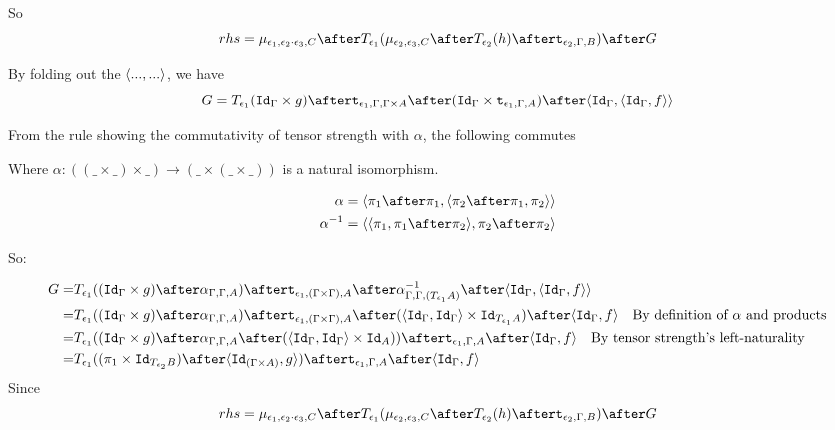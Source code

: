 \documentclass{report}
\begin{document}
So
\begin{equation}
    rhs = \bind{\e_1}{\e_2\dot\e_3}{C}\after\T{\e_1}{(\bind{\e_2}{\e_3}{C}\after \T{\e_2}{(h)} \after \tstrength{\e_2}{\G}{B})}\after G
\end{equation}


By folding out the $\langle..., ...\rangle$, we have
\begin{equation}
    G = \T{\e_1}{(\idg\times g)}\after\tstrength{\e_1}{\G}{\G \times A}\after(\idg\times\tstrength{\e_1}{\G}{A})\after\pr{\idg}{\pr{\idg}{f}}
\end{equation}

From the rule  showing the commutativity of tensor strength with $\alpha$, the following commutes


Where $\alpha: ((\_ \times \_) \times \_) \rightarrow (\_ \times (\_ \times \_))$ is a natural isomorphism.

\begin{align}
    \alpha & = \pr{\p\after\p}{\pr{\pp\after\p}{\pp}}\\
    \alpha^{-1} &= \pr{\pr{\p}{\p\after\pp}}{\pp\after\pp}
\end{align}

So:

\begin{equation}
    \begin{split}
        G = & \T{\e_1}{((\idg\times g)\after \alpha_{\G, \G, A})} \after \tstrength{\e_1}{(\G\times\G)}{A}\after\alpha^{-1}_{\G, \G, (\T{\e_1}{A})}\after\pr{\idg}{\pr{\idg}{f}} \\
        = & \T{\e_1}{((\idg\times g)\after \alpha_{\G, \G, A})} \after \tstrength{\e_1}{(\G\times\G)}{A}\after(\pr{\idg}{\idg}\times \Id{\T{\e_1}{A}})\after\pr{\idg}{f}\qt{By definition of $\alpha$ and products}\\
        = & \T{\e_1}{((\idg\times g)\after \alpha_{\G, \G, A}\after(\pr{\idg}{\idg}\times \Id{A}))}\after\tstrength{\e_1}{\G}{A}\after\pr{\idg}{f}\qt{By tensor strength's left-naturality}\\
        = & \T{\e_1}{((\p\times\Id{\T{\e_2}{B}})\after\pr{\Id{(\G\times A)}}{g})}\after\tstrength{\e_1}{\G}{A}\after\pr{\idg}{f}
    \end{split}
\end{equation}
Since 
\begin{equation}
rhs = \bind{\e_1}{\e_2\dot\e_3}{C}\after\T{\e_1}{(\bind{\e_2}{\e_3}{C}\after \T{\e_2}{(h)} \after \tstrength{\e_2}{\G}{B})}\after G
\end{equation}
\end{document}
